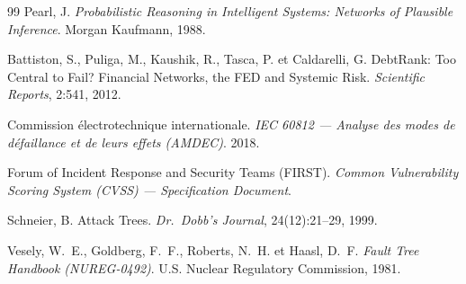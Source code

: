\documentclass[11pt,a4paper]{article}
\begin{document}
\begin{thebibliography}{99}
Pearl, J.
\emph{Probabilistic Reasoning in Intelligent Systems: Networks of Plausible Inference}.
Morgan Kaufmann, 1988.

Battiston, S., Puliga, M., Kaushik, R., Tasca, P. et Caldarelli, G.
\og DebtRank: Too Central to Fail? Financial Networks, the FED and Systemic Risk\fg{}.
\emph{Scientific Reports}, 2:541, 2012.

Commission électrotechnique internationale.
\emph{IEC 60812 --- Analyse des modes de défaillance et de leurs effets (AMDEC)}. 2018.

Forum of Incident Response and Security Teams (FIRST).
\emph{Common Vulnerability Scoring System (CVSS) --- Specification Document}.

Schneier, B.
\og Attack Trees\fg{}.
\emph{Dr.\ Dobb's Journal}, 24(12):21--29, 1999.

Vesely, W.~E., Goldberg, F.~F., Roberts, N.~H. et Haasl, D.~F.
\emph{Fault Tree Handbook (NUREG-0492)}. U.S. Nuclear Regulatory Commission, 1981.

\end{thebibliography}
\end{document}
